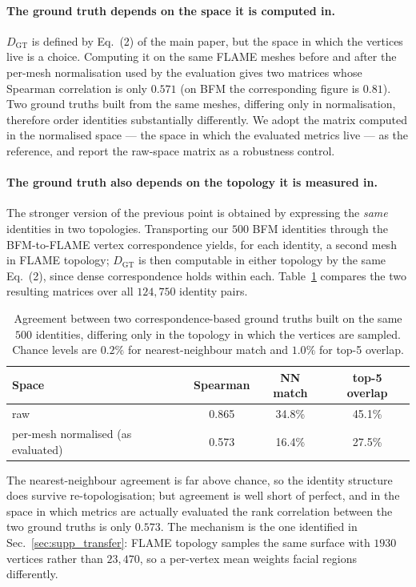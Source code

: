 \documentclass{article}
\begin{document}
\paragraph{The ground truth depends on the space it is computed in.}
$D_{\mathrm{GT}}$ is defined by Eq.~(2) of the main paper, but the space in which the
vertices live is a choice. Computing it on the same FLAME meshes before and after the
per-mesh normalisation used by the evaluation gives two matrices whose Spearman
correlation is only $0.571$ (on BFM the corresponding figure is $0.81$). Two ground
truths built from the same meshes, differing only in normalisation, therefore order
identities substantially differently. We adopt the matrix computed in the normalised
space --- the space in which the evaluated metrics live --- as the reference, and report
the raw-space matrix as a robustness control.

\paragraph{The ground truth also depends on the topology it is measured in.}
The stronger version of the previous point is obtained by expressing the \emph{same}
identities in two topologies. Transporting our $500$ BFM identities through the
BFM-to-FLAME vertex correspondence yields, for each identity, a second mesh in FLAME
topology; $D_{\mathrm{GT}}$ is then computable in either topology by the same Eq.~(2),
since dense correspondence holds within each. Table~\ref{tab:supp_gt_topology} compares the
two resulting matrices over all $124{,}750$ identity pairs.

\begin{table}[!ht]
\centering
\small
\caption{Agreement between two correspondence-based ground truths built on the same $500$
identities, differing only in the topology in which the vertices are sampled. Chance levels
are $0.2\%$ for nearest-neighbour match and $1.0\%$ for top-5 overlap.}
\label{tab:supp_gt_topology}
\begin{tabular}{lccc}
\toprule
Space & Spearman & NN match & top-5 overlap \\
\midrule
raw                                & 0.865 & 34.8\% & 45.1\% \\
per-mesh normalised (as evaluated) & 0.573 & 16.4\% & 27.5\% \\
\bottomrule
\end{tabular}
\end{table}

The nearest-neighbour agreement is far above chance, so the identity structure does survive
re-topologisation; but agreement is well short of perfect, and in the space in which metrics
are actually evaluated the rank correlation between the two ground truths is only $0.573$.
The mechanism is the one identified in Sec.~\ref{sec:supp_transfer}: FLAME topology samples
the same surface with $1930$ vertices rather than $23{,}470$, so a per-vertex mean weights
facial regions differently.
\end{document}
